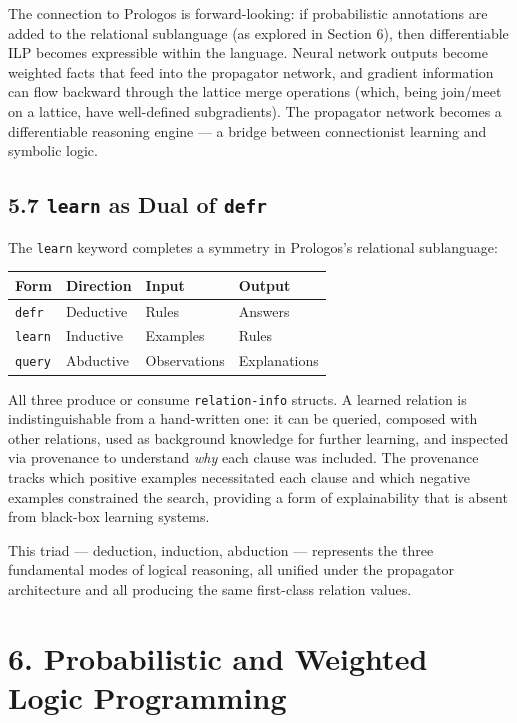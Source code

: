 \documentclass[11pt]{article}
\begin{document}
The connection to Prologos is forward-looking: if probabilistic
annotations are added to the relational sublanguage (as explored in
Section 6), then differentiable ILP becomes expressible within the
language. Neural network outputs become weighted facts that feed into
the propagator network, and gradient information can flow backward
through the lattice merge operations (which, being join/meet on a
lattice, have well-defined subgradients). The propagator network
becomes a differentiable reasoning engine --- a bridge between
connectionist learning and symbolic logic.
\subsection{5.7 \texttt{learn} as Dual of \texttt{defr}}
\label{sec:org9adbb69}

The \texttt{learn} keyword completes a symmetry in Prologos's relational
sublanguage:

\begin{center}
\begin{tabular}{llll}
Form & Direction & Input & Output\\
\hline
\texttt{defr} & Deductive & Rules & Answers\\
\texttt{learn} & Inductive & Examples & Rules\\
\texttt{query} & Abductive & Observations & Explanations\\
\end{tabular}
\end{center}

All three produce or consume \texttt{relation-info} structs. A learned
relation is indistinguishable from a hand-written one: it can be
queried, composed with other relations, used as background knowledge
for further learning, and inspected via provenance to understand \emph{why}
each clause was included. The provenance tracks which positive
examples necessitated each clause and which negative examples
constrained the search, providing a form of explainability that is
absent from black-box learning systems.

This triad --- deduction, induction, abduction --- represents the
three fundamental modes of logical reasoning, all unified under the
propagator architecture and all producing the same first-class
relation values.
\section{6. Probabilistic and Weighted Logic Programming}
\label{sec:org15a6a39}
\end{document}
